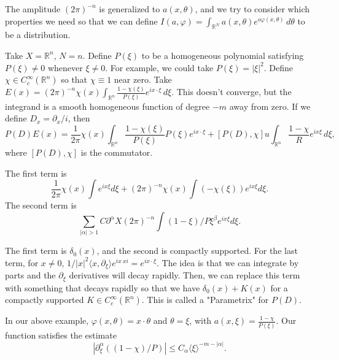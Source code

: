\documentclass[12pt]{scrartcl}
\newcommand{\R}{\mathbb{R}}
\newcommand{\<}{\langle}
\renewcommand{\>}{\rangle}
\let \phi \varphi
\begin{document}
The amplitude $(2\pi)^{-n}$ is generalized to $a(x, \theta)$, and we try to consider which properties we need so that we can define $I(a, \phi) = \int_{\R^N} a(x, \theta) e^{o\phi(x, \theta)}\, d\theta$ to be a distribution.  
\begin{example} Take $X = \R^n$, $N = n$.  Define $P(\xi)$ to be a homogeneous polynomial satisfying $P(\xi) \ne 0$ whenever $\xi \ne 0$.  For example, we could take $P(\xi) = |\xi|^2$.  Define $\chi \in C_c^\infty(\R^n)$ so that $\chi \equiv 1$ near zero.  Take $E(x) = (2\pi)^{-n} \chi(x) \int_{\R^n}\frac{1 - \chi(\xi)}{P(\xi)} e^{ix \cdot \xi}\,d\xi$.  This doesn't converge, but the integrand is a smooth homogeneous function of degree $-m$ away from zero.  If we define $D_x = \partial_x/i$, then $$P(D)E(x) = \frac{1}{2\pi} \chi(x) \int_{\R^{n}} \frac{1 - \chi(\xi)}{P(\xi)} P(\xi) e^{ix \cdot \xi} + [P(D), \chi]u \int_{\R^n} \frac{1 - \chi}{R}e^{ix \xi}\,d\xi,$$
where $[P(D), \chi]$ is the commutator.  

The first term is $$\frac{1}{2\pi} \chi(x)\int e^{ix\xi}d\xi + (2\pi)^{-n} \chi(x) \int (-\chi(\xi))e^{ix\xi}d\xi.$$
The second term is 
$$\sum_{|\alpha| > 1} C \partial^\alpha X (2\pi)^{-n} \int (1-\xi)/P \xi^\beta e^{ix\xi} d\xi.$$

The first term is $\delta_0(x)$, and the second is compactly supported.  For the last term, for $x \ne 0$, $1/|x|^2 \<x, \partial_\xi\>e^{ix\ xi} = e^{ix \cdot \xi}$.  The idea is that we can integrate by parts and the $\partial_{\xi}$ derivatives will decay rapidly.  Then, we can replace this term with something that decays rapidly so that  we have $\delta_0(x) + K(x)$ for a compactly supported $K \in C_c^\infty(\R^{n})$.  This is called a "Parametrix" for $P(D)$.
\end{example}

In our above example, $\phi(x, \theta) = x \cdot \theta$ and $\theta = \xi$, with $a(x, \xi) = \frac{1 - \chi}{P(\xi)}$.  Our function satisfies the estimate
$$|\partial_{\xi}^\alpha ((1 - \chi)/P)| \le C_\alpha \<\xi\>^{-m - |\alpha|}.$$
\end{document}
